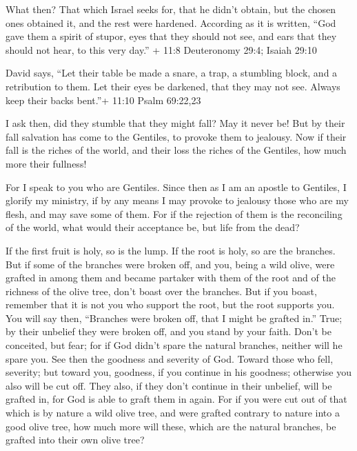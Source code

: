  What then? That which Israel seeks for, that he didn't
obtain, but the chosen ones obtained it, and the rest were hardened.
 According as it is written, ``God gave them a spirit of
stupor, eyes that they should not see, and ears that they should not
hear, to this very day.'' + 11:8 Deuteronomy 29:4; Isaiah 29:10

 David says, ``Let their table be made a snare, a trap, a
stumbling block, and a retribution to them.  Let their eyes
be darkened, that they may not see. Always keep their backs bent.''+
11:10 Psalm 69:22,23

 I ask then, did they stumble that they might fall? May it
never be! But by their fall salvation has come to the Gentiles, to
provoke them to jealousy.  Now if their fall is the riches
of the world, and their loss the riches of the Gentiles, how much more
their fullness!

 For I speak to you who are Gentiles. Since then as I am an
apostle to Gentiles, I glorify my ministry,  if by any
means I may provoke to jealousy those who are my flesh, and may save
some of them.  For if the rejection of them is the
reconciling of the world, what would their acceptance be, but life from
the dead?

 If the first fruit is holy, so is the lump. If the root is
holy, so are the branches.  But if some of the branches
were broken off, and you, being a wild olive, were grafted in among them
and became partaker with them of the root and of the richness of the
olive tree,  don't boast over the branches. But if you
boast, remember that it is not you who support the root, but the root
supports you.  You will say then, ``Branches were broken
off, that I might be grafted in.''  True; by their unbelief
they were broken off, and you stand by your faith. Don't be conceited,
but fear;  for if God didn't spare the natural branches,
neither will he spare you.  See then the goodness and
severity of God. Toward those who fell, severity; but toward you,
goodness, if you continue in his goodness; otherwise you also will be
cut off.  They also, if they don't continue in their
unbelief, will be grafted in, for God is able to graft them in again.
 For if you were cut out of that which is by nature a wild
olive tree, and were grafted contrary to nature into a good olive tree,
how much more will these, which are the natural branches, be grafted
into their own olive tree?

